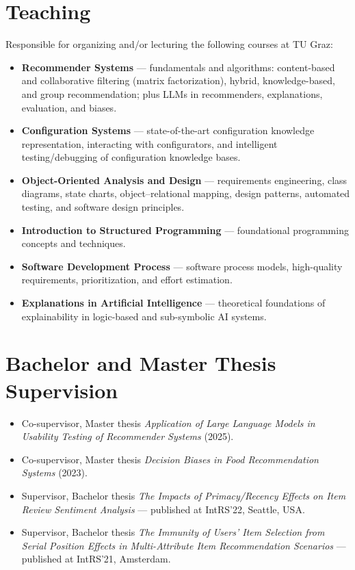 \documentclass[11pt,a4paper]{article}
\begin{document}
\section{Teaching}
Responsible for organizing and/or lecturing the following courses at TU Graz:
\begin{itemize}
  \item \textbf{Recommender Systems} --- fundamentals and algorithms: content-based and collaborative filtering (matrix factorization), hybrid, knowledge-based, and group recommendation; plus LLMs in recommenders, explanations, evaluation, and biases.
  \item \textbf{Configuration Systems} --- state-of-the-art configuration knowledge representation, interacting with configurators, and intelligent testing/debugging of configuration knowledge bases.
  \item \textbf{Object-Oriented Analysis and Design} --- requirements engineering, class diagrams, state charts, object--relational mapping, design patterns, automated testing, and software design principles.
  \item \textbf{Introduction to Structured Programming} --- foundational programming concepts and techniques.
  \item \textbf{Software Development Process} --- software process models, high-quality requirements, prioritization, and effort estimation.
  \item \textbf{Explanations in Artificial Intelligence} --- theoretical foundations of explainability in logic-based and sub-symbolic AI systems.
\end{itemize}

\section{Bachelor and Master Thesis Supervision}
\begin{itemize}
  \item Co-supervisor, Master thesis \textit{Application of Large Language Models in Usability Testing of Recommender Systems} (2025).
  \item Co-supervisor, Master thesis \textit{Decision Biases in Food Recommendation Systems} (2023).
  \item Supervisor, Bachelor thesis \textit{The Impacts of Primacy/Recency Effects on Item Review Sentiment Analysis} --- published at IntRS'22, Seattle, USA.
  \item Supervisor, Bachelor thesis \textit{The Immunity of Users' Item Selection from Serial Position Effects in Multi-Attribute Item Recommendation Scenarios} --- published at IntRS'21, Amsterdam.
\end{itemize}
\end{document}
